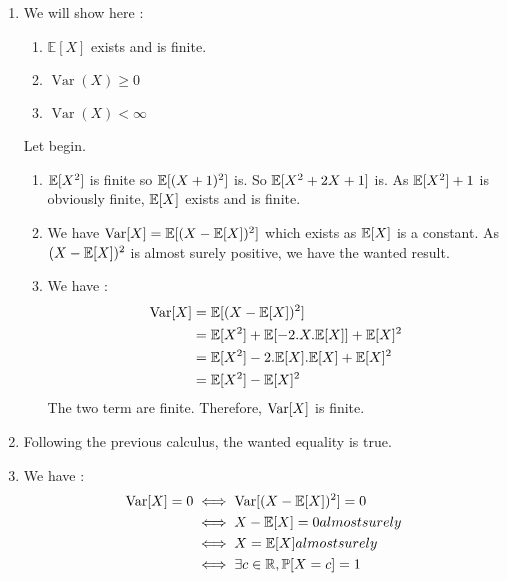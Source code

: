 \begin{solution}
  \begin{enumerate}
    \item We will show here :
          \begin{enumerate}
            \item $\mathbb{E}[X]$ exists and is finite.
            \item $\operatorname{Var}(X) \geq 0$
            \item $\operatorname{Var}(X) < \infty$
          \end{enumerate}
          Let begin.
          \begin{enumerate}
            \item $\mathbb{E}[X^2]$ is finite so $\mathbb{E}[(X+1)^2]$ is. So $\mathbb{E}[X^2 + 2X + 1]$ is.
                  As $\mathbb{E}[X^2] +1$ is obviously finite, $\mathbb{E}[X]$ exists and is finite.
            \item We have $\operatorname{Var}[X] = \mathbb{E}[(X-\mathbb{E}[X])^2]$ which exists as $\mathbb{E}[X]$ is a constant. As $(X-\mathbb{E}[X])^2$ is almost surely positive, we have the wanted result.
            \item We have :
                  \begin{align*}
                    \operatorname{Var}[X] & = \mathbb{E}[(X-\mathbb{E}[X])^2]                                     \\
                            & = \mathbb{E}[X^2] + \mathbb{E}[- 2.X.\mathbb{E}[X]] + \mathbb{E}[X]^2 \\
                            & = \mathbb{E}[X^2] - 2.\mathbb{E}[X].\mathbb{E}[X] + \mathbb{E}[X]^2   \\
                            & = \mathbb{E}[X^2] - \mathbb{E}[X]^2
                  \end{align*}
                  The two term are finite. Therefore, $\operatorname{Var}[X]$ is finite.
          \end{enumerate}
    \item Following the previous calculus, the wanted equality is true.
    \item We have :
          \begin{align*}
            \operatorname{Var}[X] = 0 & \iff \operatorname{Var}[(X-\mathbb{E}[X])^2] = 0               \\
                        & \iff X - \mathbb{E}[X] = 0 almost surely         \\
                        & \iff X = \mathbb{E}[X] almost surely             \\
                        & \iff \exists c \in \mathbb{R}, \mathbb{P}[X = c] = 1
          \end{align*}


\end{enumerate}
\end{solution}

